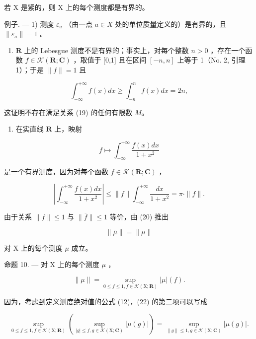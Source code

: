若 X 是紧的，则 X 上的每个测度都是有界的。

例子. --- 1) 测度 \(\varepsilon_{a}\) （由一点 \(a \in X\) 处的单位质量定义的）是有界的，且 \(\| \varepsilon_{a} \| = 1\) 。

\begin{enumerate}
\def\labelenumi{\arabic{enumi})}
\setcounter{enumi}{1}
\tightlist
\item
  \(\mathbf{R}\) 上的 Lebesgue 测度不是有界的；事实上，对每个整数 \(n > 0\) ，存在一个函数 \(f \in \mathcal{K}(\mathbf{R}; \mathbf{C})\) ，取值于 {[}0,1{]} 且在区间 \([-n, n]\) 上等于 1（No. 2, 引理 1）；于是 \(\| f \| = 1\) 且
\end{enumerate}

\[
\int_ {- \infty} ^ {+ \infty} f (x) d x \geqslant \int_ {- n} ^ {n} f (x) d x = 2 n,
\]

这证明不存在满足关系 (19) 的任何有限数 \(M\)。

\begin{enumerate}
\def\labelenumi{\arabic{enumi})}
\setcounter{enumi}{2}
\tightlist
\item
  在实直线 \(\mathbf{R}\) 上，映射
\end{enumerate}

\[
f \mapsto \int_ {- \infty} ^ {+ \infty} \frac {f (x) d x}{1 + x ^ {2}}
\]

是一个有界测度，因为对每个函数 \(f \in \mathcal{K}(\mathbf{R};\mathbf{C})\) ，

\[
\left| \int_ {- \infty} ^ {+ \infty} \frac {f (x) d x}{1 + x ^ {2}} \right| \leqslant \| f \| \int_ {- \infty} ^ {+ \infty} \frac {d x}{1 + x ^ {2}} = \pi \cdot \| f \|.
\]

由于关系 \(\| f\| \leqslant 1\) 与 \(\| \overline{f}\| \leqslant 1\) 等价，由 (20) 推出

\[
\| \overline {{\mu}} \| = \| \mu \|\tag{21}
\]

对 X 上的每个测度 \(\mu\) 成立。

命题 10. --- 对 X 上的每个测度 \(\mu\) ，

\[
\| \mu \| = \sup _ {0 \leqslant f \leqslant 1, f \in \mathcal {K} (\mathrm{X}; \mathbf {R})} | \mu | (f).\tag{22}
\]

因为，考虑到定义测度绝对值的公式 (12)，(22) 的第二项可以写成

\[
\sup _ {0 \leqslant f \leqslant 1, f \in \mathcal {K} (\mathrm{X}; \mathbf {R})} \left(\sup _ {| g | \leqslant f, g \in \mathcal {K} (\mathrm{X}; \mathbf {C})} | \mu (g) |\right) = \sup _ {\| g \| \leqslant 1, g \in \mathcal {K} (\mathrm{X}; \mathbf {C})} | \mu (g) |.
\]

